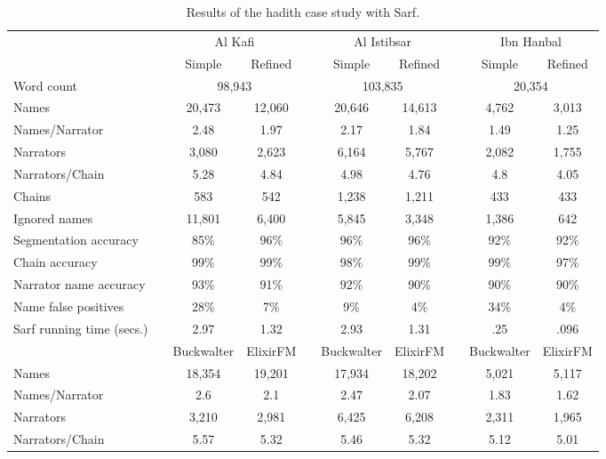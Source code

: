 \documentclass[11pt,letterpaper]{article}
\begin{document}
\begin{table*}[bt]
\centering
\caption{Results of the hadith case study with Sarf.}
\begin{tabular}{lp{.2cm}ccp{.2cm}ccp{.2cm}cc} %
 & & \multicolumn{2}{c}{Al Kafi} & & \multicolumn{2}{c}{Al Istibsar} & &\multicolumn{2}{c}{Ibn Hanbal} \\ \cline{3-10}
 & & Simple & Refined & & Simple & Refined & & Simple  & Refined \\\bottomrule  %
Word count & &\multicolumn{2}{c}{98,943} & & \multicolumn{2}{c}{103,835} & & \multicolumn{2}{c}{20,354} \\ 
 Names      & & 20,473 & 12,060  & &20,646 &  14,613& & 4,762 & 3,013\\
Names/Narrator& &2.48 & 1.97 & & 2.17 &  1.84& & 1.49 & 1.25 \\
Narrators & &3,080 & 2,623 & & 6,164 &  5,767& & 2,082 & 1,755 \\ 
Narrators/Chain & & 5.28 & 4.84 & & 4.98&  4.76 & & 4.8 &4.05 \\
Chains & & 583 & 542 &  & 1,238& 1,211& & 433 & 433 \\ 
Ignored names & & 11,801 & 6,400 &  & 5,845 & 3,348 & & 1,386 & 642 \\ \hline
Segmentation accuracy & & 85\% & 96\%& & 96\%& 96\%& & 92\%& 92\%\\ 
Chain accuracy & & 99\% & 99\%&  & 98\%& 99\%& & 99\% & 97\% \\ 
Narrator name accuracy & & 93\% & 91\%& &  92\%& 90\% & & 90\% & 90\% \\ \hline
Name false positives & & 28\% & 7\%&  & 9\%& 4\% & & 34\% & 4\% \\ \hline
Sarf running time (secs.)& & 2.97 & 1.32 & & 2.93 & 1.31 & & .25 & .096\\ \hline \hline
 & & Buckwalter& ElixirFM & & Buckwalter & ElixirFM & & Buckwalter & ElixirFM \\\bottomrule
Names      & & 18,354 & 19,201 & & 17,934 &  18,202 & & 5,021 & 5,117 \\
Names/Narrator& & 2.6 & 2.1 & & 2.47 &  2.07 & & 1.83 & 1.62\\
Narrators & & 3,210 & 2,981 & & 6,425 &  6,208 & & 2,311 & 1,965 \\ 
Narrators/Chain & & 5.57 & 5.32 & & 5.46 &  5.32 & & 5.12 & 5.01 \\

\end{tabular}
\end{table*}
\end{document}
